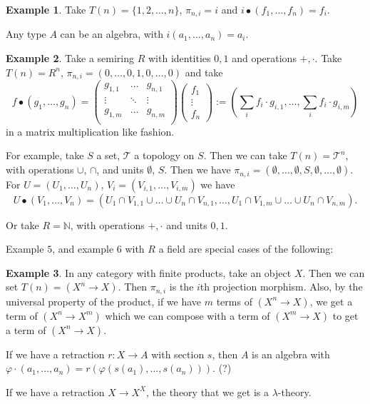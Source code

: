 \documentclass{amsart}
\theoremstyle{definition}
\newtheorem{example}{Example}
\begin{document}
  \begin{example}
    Take $ T(n) = \{ 1, 2, \dots, n \} $, $ \pi_{n, i} = i $ and $ i \bullet (f_1, \dots, f_n) = f_i $.

    Any type $ A $ can be an algebra, with $ i (a_1, \dots, a_n) = a_i $.
  \end{example}

  \begin{example}
    Take a semiring $ R $ with identities $ 0, 1 $ and operations $ +, \cdot $. Take $ T(n) = R^n $, $ \pi_{n, i} = (0, \dots, 0, 1, 0, \dots, 0) $ and take 
    \[ f \bullet (g_1, \dots, g_n) = \begin{pmatrix}
      g_{1, 1} & \dots & g_{n, 1}\\
      \vdots & \ddots & \vdots\\
      g_{1, m} & \dots & g_{n, m}\\
    \end{pmatrix} \begin{pmatrix}
      f_1 \\ \vdots \\ f_n
    \end{pmatrix} := \left( \sum_i f_i \cdot g_{i, 1}, \dots, \sum_i f_i \cdot g_{i, m} \right) \]
    in a matrix multiplication like fashion.

    For example, take $ S $ a set, $ \mathcal T $ a topology on $ S $. Then we can take $ T(n) = \mathcal T^n $, with operations $ \cup $, $ \cap $, and units $ \emptyset $, $ S $. Then we have $ \pi_{n, i} = (\emptyset, \dots, \emptyset, S, \emptyset, \dots, \emptyset) $. For $ U = (U_1, \dots, U_n) $, $ V_i = (V_{i, 1}, \dots, V_{i, m}) $ we have
    \[ U \bullet (V_1, \dots, V_n) = (U_1 \cap V_{1, 1} \cup \dots \cup U_n \cap V_{n, 1}, \dots, U_1 \cap V_{1, m} \cup \dots \cup U_n \cap V_{n, m}). \]

    Or take $ R = \mathbb N $, with operations $ +, \cdot $ and units $ 0, 1 $.
  \end{example}

  Example $ 5 $, and example $ 6 $ with $ R $ a field are special cases of the following:
  \begin{example}
    In any category with finite products, take an object $ X $. Then we can set $ T(n) = (X^n \to X) $. Then $ \pi_{n, i} $ is the $ i $th projection morphism. Also, by the universal property of the product, if we have $ m $ terms of $ (X^n \to X) $, we get a term of $ (X^n \to X^m) $ which we can compose with a term of $ (X^m \to X) $ to get a term of $ (X^n \to X) $.

    If we have a retraction $ r: X \to A $ with section $ s $, then $ A $ is an algebra with $ \varphi \cdot (a_1, \dots, a_n) = r(\varphi(s(a_1), \dots, s(a_n))) $. (?)

    If we have a retraction $ X \to X^X $, the theory that we get is a $ \lambda $-theory.
  \end{example}
\end{document}
